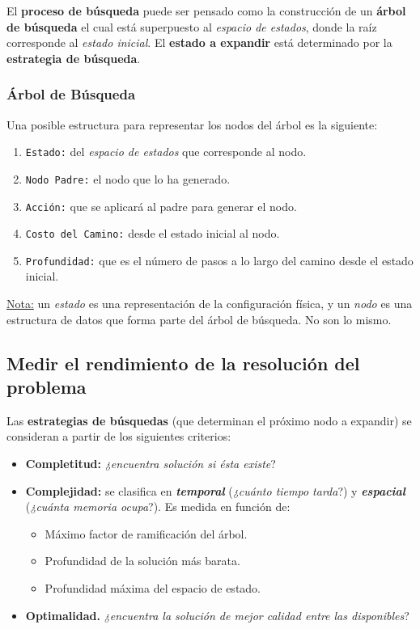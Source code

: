 \documentclass[10pt,a4paper]{article}
\begin{document}
El \textbf{proceso de búsqueda} puede ser pensado como la construcción de un \textbf{árbol de búsqueda} el cual está superpuesto al \textit{espacio de estados}, donde la raíz corresponde al \textit{estado inicial}. El \textbf{estado a expandir} está determinado por la \textbf{estrategia de búsqueda}.

\subsubsection{Árbol de Búsqueda}

Una posible estructura para representar los nodos del árbol es la siguiente:
\begin{enumerate}
\item \texttt{Estado:} del \textit{espacio de estados} que corresponde al nodo.
\item \texttt{Nodo Padre:} el nodo que lo ha generado.
\item \texttt{Acción:} que se aplicará al padre para generar el nodo.
\item \texttt{Costo del Camino:} desde el estado inicial al nodo.
\item \texttt{Profundidad:} que es el número de pasos a lo largo del camino desde el estado inicial.
\end{enumerate}

\underline{Nota:} un \textit{estado} es una representación de la configuración física, y un \textit{nodo} es una estructura de datos que forma parte del árbol de búsqueda. No son lo mismo.

\subsection{Medir el rendimiento de la resolución del problema}

Las \textbf{estrategias de búsquedas} (que determinan el próximo nodo a expandir) se consideran a partir de los siguientes criterios:
\begin{itemize}
\item \textbf{Completitud:} \textit{¿encuentra solución si ésta existe}?
\item \textbf{Complejidad:} se clasifica en \textbf{\textit{temporal}} (\textit{¿cuánto tiempo tarda}?) y \textbf{\textit{espacial}} (\textit{¿cuánta memoria ocupa}?). Es medida en función de:
\begin{itemize}
\item Máximo factor de ramificación del árbol.
\item Profundidad de la solución más barata.
\item Profundidad máxima del espacio de estado.
\end{itemize}
\item \textbf{Optimalidad.} \textit{¿encuentra la solución de mejor calidad entre las disponibles}?
\end{itemize}
\end{document}
